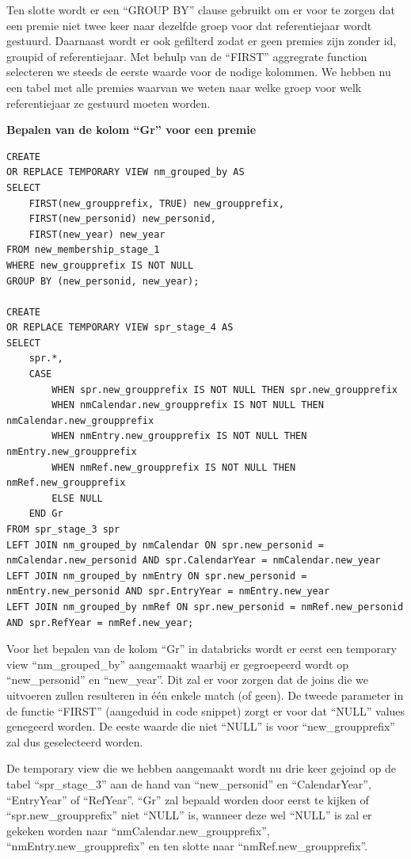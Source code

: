 Ten slotte wordt er een ``GROUP BY'' clause gebruikt om er voor te zorgen dat een premie niet twee keer naar dezelfde groep voor dat referentiejaar wordt gestuurd. Daarnaast wordt er ook gefilterd zodat er geen premies zijn zonder id, groupid of referentiejaar. Met behulp van de ``FIRST'' aggregrate function selecteren we steeds de eerste waarde voor de nodige kolommen. We hebben nu een tabel met alle premies waarvan we weten naar welke groep voor welk referentiejaar ze gestuurd moeten worden.

\pagebreak

\textbf{Bepalen van de kolom ``Gr'' voor een premie}

\begin{verbatim}
CREATE
OR REPLACE TEMPORARY VIEW nm_grouped_by AS
SELECT 
    FIRST(new_groupprefix, TRUE) new_groupprefix, 
    FIRST(new_personid) new_personid, 
    FIRST(new_year) new_year 
FROM new_membership_stage_1
WHERE new_groupprefix IS NOT NULL 
GROUP BY (new_personid, new_year);

CREATE 
OR REPLACE TEMPORARY VIEW spr_stage_4 AS 
SELECT
    spr.*,
    CASE
        WHEN spr.new_groupprefix IS NOT NULL THEN spr.new_groupprefix
        WHEN nmCalendar.new_groupprefix IS NOT NULL THEN nmCalendar.new_groupprefix
        WHEN nmEntry.new_groupprefix IS NOT NULL THEN nmEntry.new_groupprefix
        WHEN nmRef.new_groupprefix IS NOT NULL THEN nmRef.new_groupprefix
        ELSE NULL
    END Gr
FROM spr_stage_3 spr
LEFT JOIN nm_grouped_by nmCalendar ON spr.new_personid = nmCalendar.new_personid AND spr.CalendarYear = nmCalendar.new_year
LEFT JOIN nm_grouped_by nmEntry ON spr.new_personid = nmEntry.new_personid AND spr.EntryYear = nmEntry.new_year
LEFT JOIN nm_grouped_by nmRef ON spr.new_personid = nmRef.new_personid AND spr.RefYear = nmRef.new_year;
\end{verbatim}

Voor het bepalen van de kolom ``Gr'' in databricks wordt er eerst een temporary view ``nm\_grouped\_by'' aangemaakt waarbij er gegroepeerd wordt op ``new\_personid'' en ``new\_year''. Dit zal er voor zorgen dat de joins die we uitvoeren zullen resulteren in één enkele match (of geen). De tweede parameter in de functie ``FIRST'' (aangeduid in code snippet) zorgt er voor dat ``NULL'' values genegeerd worden. De eeste waarde die niet ``NULL'' is voor ``new\_groupprefix'' zal dus geselecteerd worden.

De temporary view die we hebben aangemaakt wordt nu drie keer gejoind op de tabel ``spr\_stage\_3'' aan de hand van ``new\_personid'' en ``CalendarYear'', ``EntryYear'' of ``RefYear''. ``Gr'' zal bepaald worden door eerst te kijken of ``spr.new\_groupprefix'' niet ``NULL'' is, wanneer deze wel ``NULL'' is zal er gekeken worden naar ``nmCalendar.new\_groupprefix'', ``nmEntry.new\_groupprefix'' en ten slotte naar ``nmRef.new\_groupprefix''.

